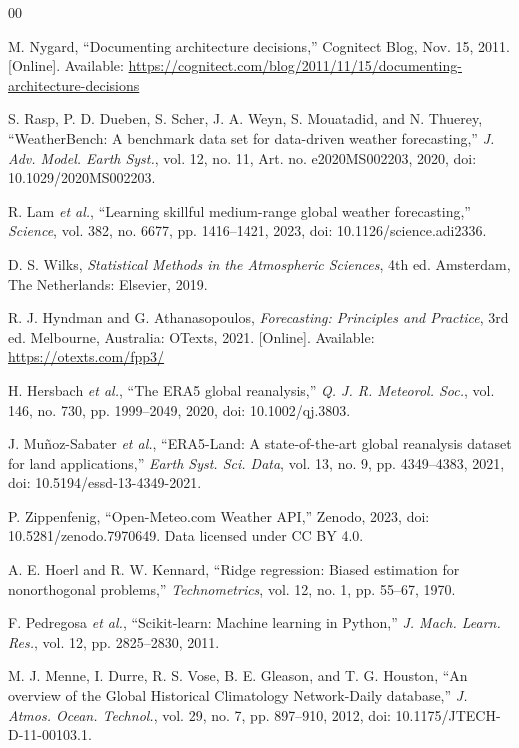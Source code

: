 \documentclass[conference]{IEEEtran}
\begin{document}
\begin{thebibliography}{00}

 M. Nygard, ``Documenting architecture decisions,'' Cognitect Blog, Nov. 15, 2011. [Online]. Available: \url{https://cognitect.com/blog/2011/11/15/documenting-architecture-decisions}

 S. Rasp, P. D. Dueben, S. Scher, J. A. Weyn, S. Mouatadid, and N. Thuerey, ``WeatherBench: A benchmark data set for data-driven weather forecasting,'' \textit{J. Adv. Model. Earth Syst.}, vol. 12, no. 11, Art. no. e2020MS002203, 2020, doi: 10.1029/2020MS002203.

 R. Lam \textit{et al.}, ``Learning skillful medium-range global weather forecasting,'' \textit{Science}, vol. 382, no. 6677, pp. 1416--1421, 2023, doi: 10.1126/science.adi2336.

 D. S. Wilks, \textit{Statistical Methods in the Atmospheric Sciences}, 4th ed. Amsterdam, The Netherlands: Elsevier, 2019.

 R. J. Hyndman and G. Athanasopoulos, \textit{Forecasting: Principles and Practice}, 3rd ed. Melbourne, Australia: OTexts, 2021. [Online]. Available: \url{https://otexts.com/fpp3/}

 H. Hersbach \textit{et al.}, ``The ERA5 global reanalysis,'' \textit{Q. J. R. Meteorol. Soc.}, vol. 146, no. 730, pp. 1999--2049, 2020, doi: 10.1002/qj.3803.

 J. Mu\~{n}oz-Sabater \textit{et al.}, ``ERA5-Land: A state-of-the-art global reanalysis dataset for land applications,'' \textit{Earth Syst. Sci. Data}, vol. 13, no. 9, pp. 4349--4383, 2021, doi: 10.5194/essd-13-4349-2021.

 P. Zippenfenig, ``Open-Meteo.com Weather API,'' Zenodo, 2023, doi: 10.5281/zenodo.7970649. Data licensed under CC BY 4.0.

 A. E. Hoerl and R. W. Kennard, ``Ridge regression: Biased estimation for nonorthogonal problems,'' \textit{Technometrics}, vol. 12, no. 1, pp. 55--67, 1970.

 F. Pedregosa \textit{et al.}, ``Scikit-learn: Machine learning in Python,'' \textit{J. Mach. Learn. Res.}, vol. 12, pp. 2825--2830, 2011.

 M. J. Menne, I. Durre, R. S. Vose, B. E. Gleason, and T. G. Houston, ``An overview of the Global Historical Climatology Network-Daily database,'' \textit{J. Atmos. Ocean. Technol.}, vol. 29, no. 7, pp. 897--910, 2012, doi: 10.1175/JTECH-D-11-00103.1.


\end{thebibliography}
\end{document}
